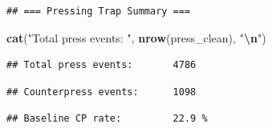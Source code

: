 \documentclass[
]{article}
\newenvironment{Shaded}{\begin{snugshade}}{\end{snugshade}}
\newcommand{\DecValTok}[1]{\textcolor[rgb]{0.00,0.00,0.81}{#1}}
\newcommand{\FunctionTok}[1]{\textcolor[rgb]{0.13,0.29,0.53}{\textbf{#1}}}
\newcommand{\NormalTok}[1]{#1}
\newcommand{\SpecialCharTok}[1]{\textcolor[rgb]{0.81,0.36,0.00}{\textbf{#1}}}
\newcommand{\StringTok}[1]{\textcolor[rgb]{0.31,0.60,0.02}{#1}}
\begin{document}
\begin{verbatim}
## === Pressing Trap Summary ===
\end{verbatim}

\begin{Shaded}
\begin{Highlighting}[]
\FunctionTok{cat}\NormalTok{(}\StringTok{"Total press events:      "}\NormalTok{, }\FunctionTok{nrow}\NormalTok{(press\_clean), }\StringTok{"}\SpecialCharTok{\textbackslash{}n}\StringTok{"}\NormalTok{)}
\end{Highlighting}
\end{Shaded}

\begin{verbatim}
## Total press events:       4786
\end{verbatim}

\begin{Shaded}
\end{Shaded}

\begin{verbatim}
## Counterpress events:      1098
\end{verbatim}

\begin{Shaded}
\end{Shaded}

\begin{verbatim}
## Baseline CP rate:         22.9 %
\end{verbatim}
\end{document}
